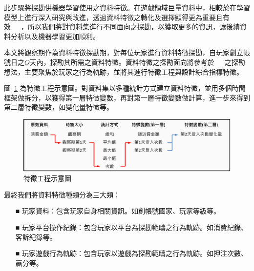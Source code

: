 此步驟將探勘供機器學習使用之資料特徵。在遊戲領域巨量資料中，相較於在學習模型上進行深入研究與改進，透過資料特徵之轉化及選擇顯得更為重要且有效~\cite{SupervisedMachineLearning}~\cite{lee2018game}~\cite{XGBoostTemporalData}，所以我們將對資料集進行不同面向之探勘，以獲取更多的資訊，讓後續資料分析以及機器學習更加順利。

本文將觀察期作為資料特徵探勘期，對每位玩家進行資料特徵探勘，自玩家創立帳號日之$O$天內，探勘其所需之資料特徵。資料特徵之探勘面向將參考於~\cite{sifa2015predicting}~\cite{lee2016predicting}~\cite{martinez2020machine}之探勘想法，主要聚焦於玩家之行為軌跡，並將其進行特徵工程與設計綜合指標特徵。

圖~\ref{fig:Image_FeatureEngineering} 為特徵工程示意圖。對資料集以多種統計方式建立資料特徵，並用多個時間框架做拆分，以獲得第一層特徵變數，再對第一層特徵變數做計算，進一步來得到第二層特徵變數，如變化量特徵等。

\begin{figure}[!htb]
  \begin{center}
    \includegraphics[width=1\textwidth]{figures/Image_FeatureEngineering.png}
    \caption[特徵工程示意圖]{特徵工程示意圖}
    \label{fig:Image_FeatureEngineering}
  \end{center}
\end{figure}

最終我們將資料特徵種類分為三大類：

\begin{itemize}
  \item[■] 玩家資料：包含玩家自身相關資訊。如創帳號國家、玩家等級等。
  \item[■] 玩家平台操作紀錄：包含玩家以平台為探勘範疇之行為軌跡。如消費紀錄、客訴紀錄等。
  \item[■] 玩家遊戲行為軌跡：包含玩家以遊戲為探勘範疇之行為軌跡。如押注次數、贏分等。
\end{itemize}


